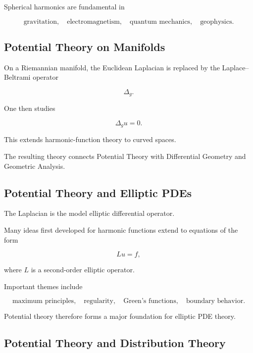 Spherical harmonics are fundamental in

\[
\boxed{
\text{gravitation},
\quad
\text{electromagnetism},
\quad
\text{quantum mechanics},
\quad
\text{geophysics}.
}
\]

\subsection{Potential Theory on Manifolds}
\label{subsec:potential-theory-manifolds}

On a Riemannian manifold, the Euclidean Laplacian is replaced by the
Laplace--Beltrami operator

\[
\boxed{
\Delta_g.
}
\]

One then studies

\[
\boxed{
\Delta_g u=0.
}
\]

This extends harmonic-function theory to curved spaces.

The resulting theory connects Potential Theory with Differential Geometry
and Geometric Analysis.

\subsection{Potential Theory and Elliptic PDEs}
\label{subsec:potential-elliptic-pdes}

The Laplacian is the model elliptic differential operator.

Many ideas first developed for harmonic functions extend to equations of
the form

\[
\boxed{
Lu=f,
}
\]

where \(L\) is a second-order elliptic operator.

Important themes include

\[
\boxed{
\text{maximum principles},
\quad
\text{regularity},
\quad
\text{Green's functions},
\quad
\text{boundary behavior}.
}
\]

Potential theory therefore forms a major foundation for elliptic PDE
theory.

\subsection{Potential Theory and Distribution Theory}
\label{subsec:potential-distribution-connection}


